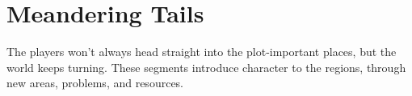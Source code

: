 \section{Meandering Tails}

\noindent
The players won't always head straight into the plot-important places, but the world keeps turning.
These \glspl{segment} introduce character to the \glspl{region}, through new areas, problems, and resources.
